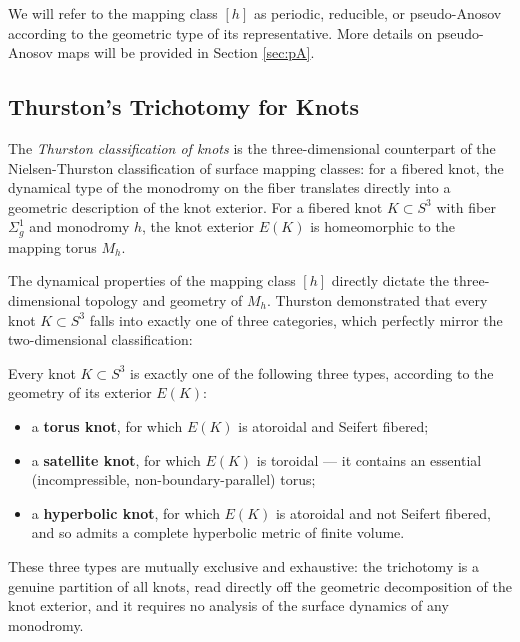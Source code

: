 We will refer to the mapping class $[h]$ as periodic, reducible, or pseudo-Anosov according to the geometric type of its representative. More details on pseudo-Anosov maps will be provided in Section \ref{sec:pA}.

\subsection*{Thurston's Trichotomy for Knots}
The \emph{Thurston classification of knots} is the three-dimensional counterpart of the Nielsen-Thurston classification of surface mapping classes: for a fibered knot, the dynamical type of the monodromy on the fiber translates directly into a geometric description of the knot exterior. For a fibered knot $K \subset S^3$ with fiber $\Sigma_g^1$ and monodromy $h$, the knot exterior $E(K)$ is homeomorphic to the mapping torus $M_h$.

The dynamical properties of the mapping class $[h]$ directly dictate the three-dimensional topology and geometry of $M_h$. Thurston demonstrated that every knot $K \subset S^3$ falls into exactly one of three categories, which perfectly mirror the two-dimensional classification:

\begin{theorem} \label{theorem:thurston classification of knots}
    Every knot $K \subset S^3$ is exactly one of the following three types, according to the geometry of its exterior $E(K)$:
    \begin{itemize}
        \item a \textbf{torus knot}, for which $E(K)$ is atoroidal and Seifert fibered;
        \item a \textbf{satellite knot}, for which $E(K)$ is toroidal --- it contains an essential (incompressible, non-boundary-parallel) torus;
        \item a \textbf{hyperbolic knot}, for which $E(K)$ is atoroidal and not Seifert fibered, and so admits a complete hyperbolic metric of finite volume.
    \end{itemize}
    These three types are mutually exclusive and exhaustive: the trichotomy is a genuine partition of all knots, read directly off the geometric decomposition of the knot exterior, and it requires no analysis of the surface dynamics of any monodromy.
\end{theorem}

